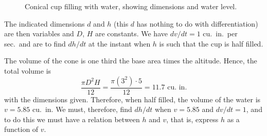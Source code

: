 \begin{figure}[h]
    \centering
    \caption{Conical cup filling with water, showing dimensions and water level.}
    \label{fig:cone}
\end{figure}

The indicated dimensions $d$ and $h$ (this $d$ has nothing to do with differentiation) are then variables and $D$, $H$ are constants. We have $dv/dt = 1$ cu.\ in.\ per sec.\ and are to find $dh/dt$ at the instant when $h$ is such that the cup is half filled.

The volume of the cone is one third the base area times the altitude. Hence, the total volume is
\[\frac{\pi D^2H}{12} = \frac{\pi(3^2)\cdot 5}{12} = 11.7\text{ cu.\ in.}\]
with the dimensions given. Therefore, when half filled, the volume of the water is $v = 5.85$ cu.\ in. We must, therefore, find $dh/dt$ when $v = 5.85$ and $dv/dt = 1$, and to do this we must have a relation between $h$ and $v$, that is, express $h$ as a function of $v$.

